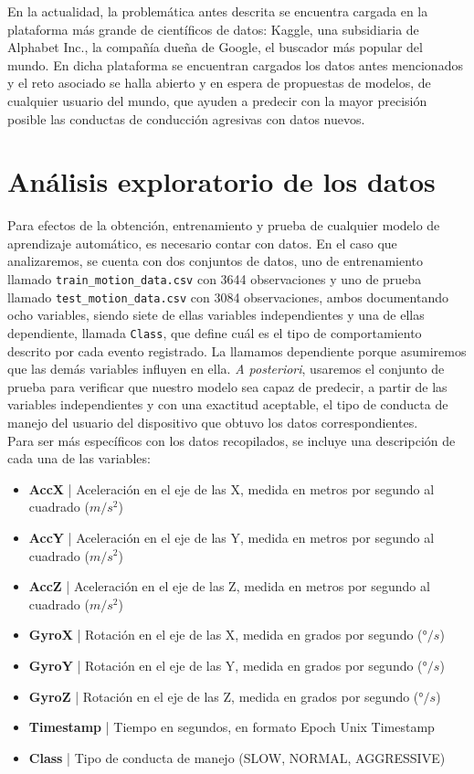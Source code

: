 \documentclass[spanish,12pt,letterpaper]{article}
\begin{document}
\textsc En la actualidad, la problemática antes descrita se encuentra cargada en la plataforma más grande de científicos de datos: Kaggle, una subsidiaria de Alphabet Inc., la compañía dueña de Google, el buscador más popular del mundo. En dicha plataforma se encuentran cargados los datos antes mencionados y el reto asociado se halla abierto y en espera de propuestas de modelos, de cualquier usuario del mundo, que ayuden a predecir con la mayor precisión posible las conductas de conducción agresivas con datos nuevos. \\

\section{Análisis exploratorio de los datos}

\textsc Para efectos de la obtención, entrenamiento y prueba de cualquier modelo de aprendizaje automático, es necesario contar con datos. En el caso que analizaremos, se cuenta con dos conjuntos de datos, uno de entrenamiento llamado \verb|train_motion_data.csv| con 3644 observaciones y uno de prueba llamado \verb|test_motion_data.csv| con 3084 observaciones, ambos documentando ocho variables, siendo siete de ellas variables independientes y una de ellas dependiente, llamada \verb|Class|, que define cuál es el tipo de comportamiento descrito por cada evento registrado. La llamamos dependiente porque asumiremos que las demás variables influyen en ella. \textit{A posteriori}, usaremos el conjunto de prueba para verificar que nuestro modelo sea capaz de predecir, a partir de las variables independientes y con una exactitud aceptable, el tipo de conducta de manejo del usuario del dispositivo que obtuvo los datos correspondientes. \\

\textsc Para ser más específicos con los datos recopilados, se incluye una descripción de cada una de las variables:
\begin{itemize}
    \item \textbf{AccX} | Aceleración en el eje de las X, medida en metros por segundo al cuadrado ($m/s^2$)
    \item \textbf{AccY} | Aceleración en el eje de las Y, medida en metros por segundo al cuadrado ($m/s^2$)
    \item \textbf{AccZ }| Aceleración en el eje de las Z, medida en metros por segundo al cuadrado ($m/s^2$)
    \item \textbf{GyroX} | Rotación en el eje de las X, medida en grados por segundo (°$/s$)
    \item \textbf{GyroY} | Rotación en el eje de las Y, medida en grados por segundo (°$/s$)
    \item \textbf{GyroZ} | Rotación en el eje de las Z, medida en grados por segundo (°$/s$)
    \item \textbf{Timestamp} | Tiempo en segundos, en formato Epoch Unix Timestamp
    \item \textbf{Class} | Tipo de conducta de manejo (SLOW, NORMAL, AGGRESSIVE)
\end{itemize} \\
\end{document}
